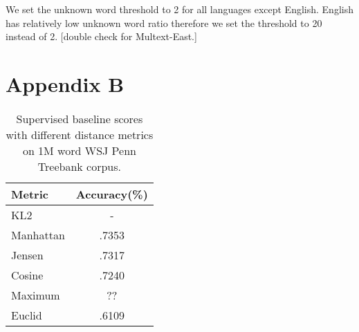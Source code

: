 We set the unknown word threshold to 2 for all languages except
English.  English has relatively low unknown word ratio therefore we
set the threshold to 20 instead of 2. [double check for Multext-East.]

\section{Appendix B}
\label{app:dist1M}
\begin{table}[ht] \centering
\begin{tabular}{|l|c|}
\hline
Metric & Accuracy(\%) \\
\hline
KL2 & - \\
Manhattan & .7353\\ %
Jensen & .7317 \\ %
Cosine & .7240 \\ %
Maximum & ?? \\
Euclid & .6109 \\ %
\hline
\end{tabular}
\caption{Supervised baseline scores with different 
distance metrics on 1M word WSJ Penn Treebank corpus.}
\label{tab:distscores1M}
\end{table}


